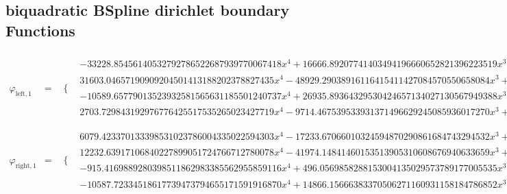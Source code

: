 \documentclass{article}
\begin{document}
 \begin{landscape}
 \subsection{biquadratic BSpline dirichlet boundary Functions}
 \begin{eqnarray*}
 \varphi_{\text{left},1} & = & \begin{array}{cc}
 \{ & 
\begin{array}{cc}
 -33228.85456140532792786522687939770067418 x^4+16666.89207741403494196660652821396223519 x^3-2657.344818075586008543016595882334516147 x^2+138.7366804101170692387962218123285401531 x & x\geq 0\land x<\frac{1}{4} \\
 31603.04657190909204501413188202378827435 x^4-48929.29038916116415411427084570550658084 x^3+27776.88295663212798259445881818369652957 x^2-6831.086815293041344119736900199629638982 x+612.0073752447855117507447809295516134719 & x\geq \frac{1}{4}\land x<\frac{1}{2} \\
 -10589.65779013523932581565631185501240737 x^4+26935.89364329530424657134027130567949388 x^3-25489.98278174461892092950171925405067377 x^2+10633.24307976351994430490939641912834918 x-1649.545119118596245989427860529363796507 & x\geq \frac{1}{2}\land x<\frac{3}{4} \\
 2703.729843192976776425517535265023427719 x^4-9714.467539533931371496629245085936017270 x^3+13030.64294780065002583888616952774259813 x^2-7732.802649771413042889954744857770855326 x+1712.897398311717612122180285150940846747 & x\geq \frac{3}{4}\land x<1
\end{array}

\end{array}\\ 
\varphi_{\text{right},1} & = & \begin{array}{cc}
 \{ & 
\begin{array}{cc}
 6079.423370133398531023786004335022594303 x^4-17233.67066010324594870290861684743294532 x^3+17929.93240754090941257007868444584120806 x^2-8118.834205828765696829465540546901904773 x+1350.731459696289617243102013230035895835 & x\geq \frac{1}{2}\land x<\frac{3}{4} \\
 12232.63917106840227899051724766712780078 x^4-41974.14841460153513905310608676940633659 x^3+53893.21768435392954896140456393254656450 x^2-30697.75757441025171739435510240655737761 x+6546.049133589455028495539377576289348915 & x\geq \frac{3}{4}\land x<1 \\
 -915.4169889280398511862983385562955859116 x^4+496.0569858288153004135029573789177005535 x^3-61.79793488198083681694009775719657644114 x^2 & x\geq 0\land x<\frac{1}{4} \\
 -10587.72334518617739473794655171591916870 x^4+14866.15666383370506271160931158184786852 x^3-7618.850847560015855144044094856758409607 x^2+1688.651913979234275204635070459207984014 x-136.5975322171244329121240537478453856848 & x\geq \frac{1}{4}\land x<\frac{1}{2}
\end{array}

\end{array}\end{eqnarray*}
\end{landscape}
\end{document}
